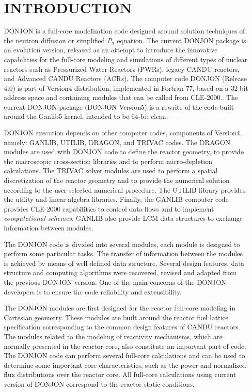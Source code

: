 \section{INTRODUCTION}\label{sect:intro}

DONJON is a full-core modelization code designed around solution techniques of 
the neutron diffusion or simplified $P_n$ equation.\cite{PIP2016}
The current DONJON package is an evolution version, released as an attempt
to introduce the innovative capabilities for the full-core modeling and simulations
of different types of nuclear reactors sush as Pressurized Water Reactors (PWRs),
legacy CANDU reactors, and Advanced CANDU Reactors (ACRs). The computer code DONJON (Release 4.0)
is part of Version4 distribution\cite{v4}, implemented in Fortran-77, based on a 32-bit address
space and containing modules that can be called from CLE-2000.\cite{cle2000}. The current DONJON
package (DONJON Version5) is a rewrite of the code built around the Ganlib5 kernel, intended to
be 64-bit clean.\cite{ganlib5}

DONJON execution depends on other computer codes, components of Version4,
namely: GANLIB, UTILIB, DRAGON\cite{dragon}, and TRIVAC\cite{trivac}
codes. The DRAGON modules are used with DONJON code to define the reactor
geometry, to provide the macroscopic cross-section libraries and to perform
micro-depletion calculations. The TRIVAC
solver modules are used to perform a spatial discretization of the reactor geometry
and to provide the numerical solution according to the user-selected numerical
procedure\cite{ah1,ah2,ah3,ah4,ah5,ah6}.
The UTILIB library provides the utility and linear algebra libraries.
Finally, the GANLIB computer code provides CLE-2000 capabilities to control
data flows and to implement {\sl computational schemes}. GANLIB also provide
LCM data structures to exchange information between modules.

The DONJON code is divided into several modules, each module is designed
to perform some particular tasks. The transfer of information between the modules
is achieved by means of well defined data structure. Several design features,
data structure and computing algorithms were recovered, revised and adapted
from the previous DONJON version\cite{donjon,donjstruc}. One of the main
concerns of the DONJON developers is to ensure the code reliability and extensibility.

The DONJON modules are first designed for the reactor full-core modeling in
 Cartesian geometry. These modules are built around the reactor fuel
lattice specification corresponding to the common design features of CANDU
reactors. The modules related to the modeling of reactivity mechanisms, which are
normally presented in the reactor core, also constitute an important part of code.
The DONJON code can perform several full-core calculations and can be used
to determine some important core characteristics, such as the power and normalized
flux distributions over the reactor core. All full-core calculations using current version
of DONJON correspond to the reactor static conditions.

